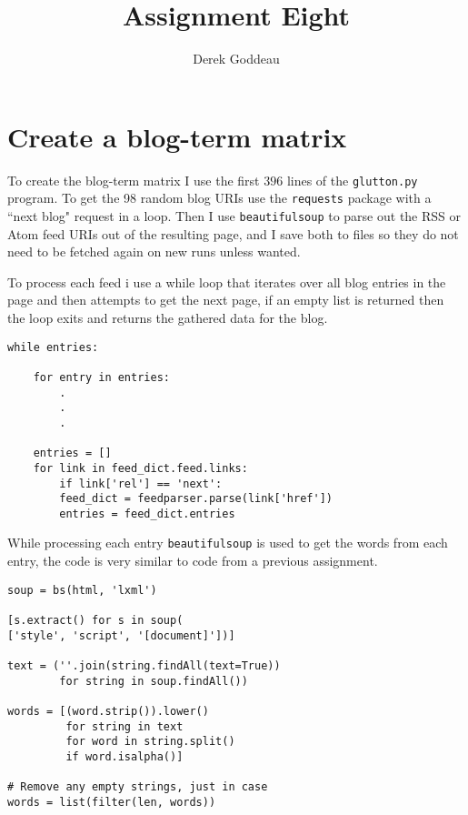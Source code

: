 \documentclass[12pt, a4paper]{article}
\author{Derek Goddeau}
\title{Assignment Eight}
\newcommand{\code}[1]{\texttt{#1}}
\begin{document}
\maketitle

\newpage



\section{Create a blog-term matrix}

To create the blog-term matrix I use the first $396$ lines of the \code{glutton.py} program. To get the 98 random blog URIs use the \code{requests} package with a ``next blog" request in a loop. Then I use \code{beautifulsoup} to parse out the RSS or Atom feed URIs out of the resulting page, and I save both to files so they do not need to be fetched again on new runs unless wanted.

To process each feed i use a while loop that iterates over all blog entries in the page and then attempts to get the next page, if an empty list is returned then the loop exits and returns the gathered data for the blog.

\begin{minipage}{\linewidth} %
\vspace{2em}
\begin{verbatim}
while entries:

    for entry in entries:
        .
        .
        .

    entries = []
    for link in feed_dict.feed.links:
        if link['rel'] == 'next':
        feed_dict = feedparser.parse(link['href'])
        entries = feed_dict.entries
\end{verbatim}
\vspace{2em}
\end{minipage}

\newpage
\noindent
While processing each entry \code{beautifulsoup} is used to get the words from each entry, the code is very similar to code from a previous assignment.

\begin{minipage}{\linewidth} %
\vspace{2em}
\begin{verbatim}
soup = bs(html, 'lxml')

[s.extract() for s in soup(
['style', 'script', '[document]'])]

text = (''.join(string.findAll(text=True))
        for string in soup.findAll())

words = [(word.strip()).lower()
         for string in text
         for word in string.split()
         if word.isalpha()]

# Remove any empty strings, just in case
words = list(filter(len, words))
\end{verbatim}
\vspace{2em}
\end{minipage}
\end{document}
